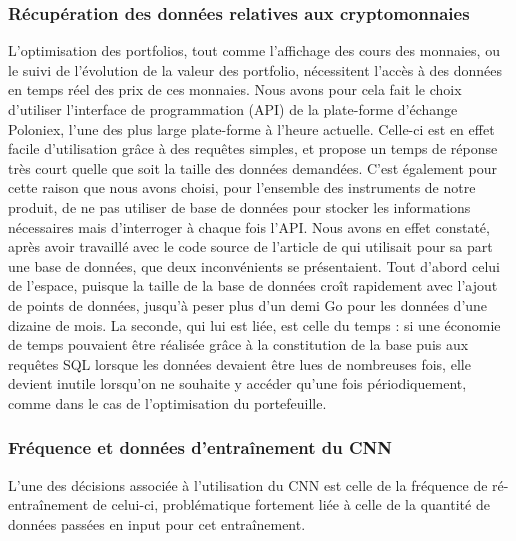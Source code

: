 \documentclass[a4paper, 10pt]{article}
\begin{document}
\subsubsection{Récupération des données relatives aux cryptomonnaies}
\label{sec:developpement_choix_data}

L'optimisation des portfolios, tout comme l'affichage des cours des monnaies, ou le suivi de l'évolution de la valeur des portfolio, nécessitent l'accès à des données en temps réel des prix de ces monnaies. Nous avons pour cela fait le choix d'utiliser l'interface de programmation (API) de la plate-forme d'échange Poloniex, l'une des plus large plate-forme à l'heure actuelle. Celle-ci est en effet facile d'utilisation grâce à des requêtes simples, et propose un temps de réponse très court quelle que soit la taille des données demandées. C'est également pour cette raison que nous avons choisi, pour l'ensemble des instruments de notre produit, de ne pas utiliser de base de données pour stocker les informations nécessaires mais d'interroger à chaque fois l'API. Nous avons en effet constaté, après avoir travaillé avec le code source de l'article de \citet{Jiang2017} qui utilisait pour sa part une base de données, que deux inconvénients se présentaient. Tout d'abord celui de l'espace, puisque la taille de la base de données croît rapidement avec l'ajout de points de données, jusqu'à peser plus d'un demi Go pour les données d'une dizaine de mois. La seconde, qui lui est liée, est celle du temps : si une économie de temps pouvaient être réalisée grâce à la constitution de la base puis aux requêtes SQL lorsque les données devaient être lues de nombreuses fois, elle devient inutile lorsqu'on ne souhaite y accéder qu'une fois périodiquement, comme dans le cas de l'optimisation du portefeuille.

\subsubsection{Fréquence et données d'entraînement du CNN}
\label{sec:developpement_choix_train}

L'une des décisions associée à l'utilisation du CNN est celle de la fréquence de ré-entraînement de celui-ci, problématique fortement liée à celle de la quantité de données passées en input pour cet entraînement. 
\end{document}
